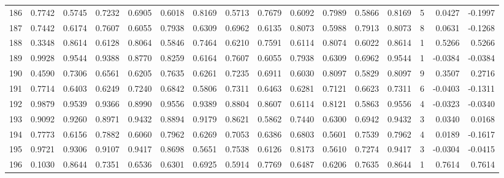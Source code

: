 \begin{tabular}{lrrrrrrrrrrrrrrr}
186 &      0.7742 &  0.5745 &  0.7232 &  0.6905 &  0.6018 &  0.8169 &  0.5713 &  0.7679 &  0.6092 &  0.7989 &   0.5866 &     0.8169 &      5 &                    0.0427 &                    -0.1997 \\
187 &      0.7442 &  0.6174 &  0.7607 &  0.6055 &  0.7938 &  0.6309 &  0.6962 &  0.6135 &  0.8073 &  0.5988 &   0.7913 &     0.8073 &      8 &                    0.0631 &                    -0.1268 \\
188 &      0.3348 &  0.8614 &  0.6128 &  0.8064 &  0.5846 &  0.7464 &  0.6210 &  0.7591 &  0.6114 &  0.8074 &   0.6022 &     0.8614 &      1 &                    0.5266 &                     0.5266 \\
189 &      0.9928 &  0.9544 &  0.9388 &  0.8770 &  0.8259 &  0.6164 &  0.7607 &  0.6055 &  0.7938 &  0.6309 &   0.6962 &     0.9544 &      1 &                   -0.0384 &                    -0.0384 \\
190 &      0.4590 &  0.7306 &  0.6561 &  0.6205 &  0.7635 &  0.6261 &  0.7235 &  0.6911 &  0.6030 &  0.8097 &   0.5829 &     0.8097 &      9 &                    0.3507 &                     0.2716 \\
191 &      0.7714 &  0.6403 &  0.6249 &  0.7240 &  0.6842 &  0.5806 &  0.7311 &  0.6463 &  0.6281 &  0.7121 &   0.6623 &     0.7311 &      6 &                   -0.0403 &                    -0.1311 \\
192 &      0.9879 &  0.9539 &  0.9366 &  0.8990 &  0.9556 &  0.9389 &  0.8804 &  0.8607 &  0.6114 &  0.8121 &   0.5863 &     0.9556 &      4 &                   -0.0323 &                    -0.0340 \\
193 &      0.9092 &  0.9260 &  0.8971 &  0.9432 &  0.8894 &  0.9179 &  0.8621 &  0.5862 &  0.7440 &  0.6300 &   0.6942 &     0.9432 &      3 &                    0.0340 &                     0.0168 \\
194 &      0.7773 &  0.6156 &  0.7882 &  0.6060 &  0.7962 &  0.6269 &  0.7053 &  0.6386 &  0.6803 &  0.5601 &   0.7539 &     0.7962 &      4 &                    0.0189 &                    -0.1617 \\
195 &      0.9721 &  0.9306 &  0.9107 &  0.9417 &  0.8698 &  0.5651 &  0.7538 &  0.6126 &  0.8173 &  0.5610 &   0.7274 &     0.9417 &      3 &                   -0.0304 &                    -0.0415 \\
196 &      0.1030 &  0.8644 &  0.7351 &  0.6536 &  0.6301 &  0.6925 &  0.5914 &  0.7769 &  0.6487 &  0.6206 &   0.7635 &     0.8644 &      1 &                    0.7614 &                     0.7614 \\

\end{tabular}
